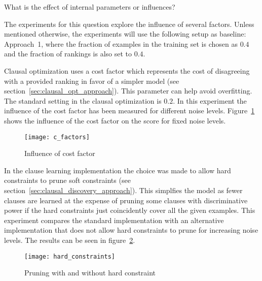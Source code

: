 \begin{question}
	What is the effect of internal parameters or influences?
\end{question}

The experiments for this question explore the influence of several factors.
Unless mentioned otherwise, the experiments will use the following setup as baseline:
Approach~1, where the fraction of examples in the training set is chosen as $0.4$ and the fraction of rankings is also set to $0.4$.

\begin{experiment}
	
	Clausal optimization uses a cost factor which represents the cost of disagreeing with a provided ranking in favor of a simpler model (see section~\ref{sec:clausal_opt_approach}).
	This parameter can help avoid overfitting.
	The standard setting in the clausal optimization is $0.2$.
	In this experiment the influence of the cost factor has been measured for different noise levels.
	Figure~\ref{fig:c_factors} shows the influence of the cost factor on the score for fixed noise levels.

	\begin{figure}

		\caption{Influence of cost factor}
		\centering
			\texttt{[image: c\_factors]}
		\label{fig:c_factors}

	\end{figure}

\end{experiment}


\begin{experiment}
	
	In the clause learning implementation the choice was made to allow hard constraints to prune soft constraints (see section~\ref{sec:clausal_discovery_approach}).
	This simplfies the model as fewer clauses are learned at the expense of pruning some clauses with discriminative power if the hard constraints just coincidently cover all the given examples.
	This experiment compares the standard implementation with an alternative implementation that does not allow hard constraints to prune for increasing noise levels.
	The results can be seen in figure~\ref{fig:hard_constraints}.

	\begin{figure}

		\caption{Pruning with and without hard constraint}
		\centering
			\texttt{[image: hard\_constraints]}
		\label{fig:hard_constraints}

	\end{figure}

\end{experiment}

